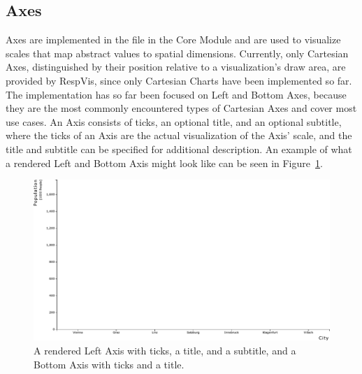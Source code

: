 \subsection{Axes}

Axes are implemented in the  file in the Core Module and
are used to visualize scales that map abstract values to spatial
dimensions. Currently, only Cartesian Axes, distinguished by their
position relative to a visualization's draw area, are provided by
RespVis, since only Cartesian Charts have been implemented so far.
The implementation has so far been focused on Left and Bottom Axes,
because they are the most commonly encountered types of Cartesian Axes
and cover most use cases. An Axis consists of ticks, an optional
title, and an optional subtitle, where the ticks of an Axis are the
actual visualization of the Axis' scale, and the title and subtitle
can be specified for additional description. An example of what a
rendered Left and Bottom Axis might look like can be seen in
Figure~\ref{fig:Axes}.

\begin{figure}[tp]
\centering
\includegraphics[keepaspectratio,width=\linewidth,height=\fullh]
{diagrams/axes.pdf}
\caption[RespVis Axis Components]{%
A rendered Left Axis with ticks, a title, and a subtitle, and a
Bottom Axis  with ticks and a title.
}
\label{fig:Axes}
\end{figure}


